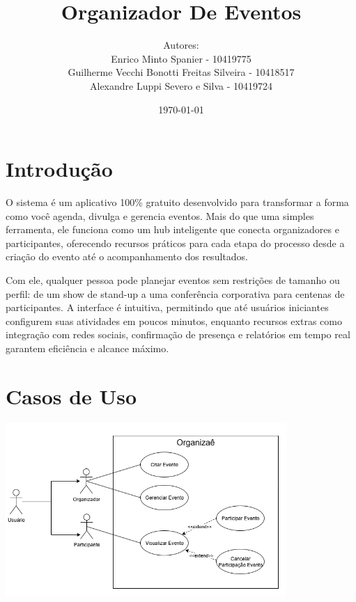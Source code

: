 \documentclass[12pt,a4paper]{article}
\begin{document}
\title{Organizador De Eventos}
\author{Autores:\\Enrico Minto Spanier - 10419775 \\ Guilherme Vecchi Bonotti Freitas Silveira - 10418517 \\ Alexandre Luppi Severo e Silva - 10419724}
\date{\today}


\maketitle
\tableofcontents
\newpage

\section{Introdução}
O sistema é um aplicativo 100\% gratuito desenvolvido para transformar a forma como você agenda, divulga e gerencia eventos. Mais do que uma simples ferramenta, ele funciona como um hub inteligente que conecta organizadores e participantes, oferecendo recursos práticos para cada etapa do processo desde a criação do evento até o acompanhamento dos resultados.

Com ele, qualquer pessoa pode planejar eventos sem restrições de tamanho ou perfil: de um show de stand-up a uma conferência corporativa para centenas de participantes. A interface é intuitiva, permitindo que até usuários iniciantes configurem suas atividades em poucos minutos, enquanto recursos extras como integração com redes sociais, confirmação de presença e relatórios em tempo real garantem eficiência e alcance máximo.

\section{Casos de Uso}

\begin{center}
  \includegraphics[width=0.8\textwidth]{D_Organizae_drawio.png}
\end{center}
\end{document}
